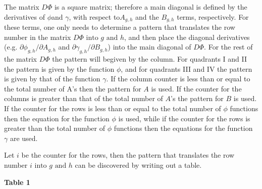 \documentclass{article}
\newcommand{\pard}[2]{\partial #1 / \partial #2}
\newcommand{\spbox}[1]{ \text{ #1 }} %
\begin{document}
The matrix $D\Phi $ is a square matrix; therefore a main diagonal is defined by
the derivatives of $\phi $and $\gamma $, with respect to$A_{g,h} $ and the
$B_{g,h} $ terms, respectively. For these terms, one only needs to determine a
pattern that translates the row number in the matrix $D\Phi \spbox{into} g\spbox{and} h$,
and then place the diagonal derivatives (e.g. $\pard{\phi_{g,h}}{A_{g,h}} $ and
$\pard{\gamma_{g,h}}{B_{g,h}} $) into the main diagonal of $D\Phi $. For the
rest of the matrix $D\Phi $ the pattern will begiven by the column. For
quadrants I and II the pattern is given by the function $\phi $, and for
quadrants III and IV the pattern is given by that of the function $\gamma $. If
the column counter is less than or equal to the total number of A's then the
pattern for $A$ is used. If the counter for the columns is greater than that of
the total number of $A$'s the pattern for $B$ is used. If the counter for the
rows is less than or equal to the total number of $\phi $ functions then the
equation for the function $\phi $ is used, while if the counter for the rows is
greater than the total number of $\phi $ functions then the equations for the
function $\gamma $ are used.

Let $i$ be the counter for the rows, then the pattern that translates the row
number $i\spbox{into} g\spbox{and} h$ can be discovered by writing out a table.

\textbf{Table 1}
\end{document}
